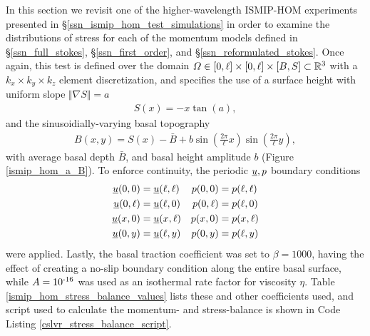 In this section we revisit one of the higher-wavelength ISMIP-HOM experiments presented in \S \ref{ssn_ismip_hom_test_simulations} in order to examine the distributions of stress for each of the momentum models defined in \S \ref{ssn_full_stokes}, \S \ref{ssn_first_order}, and \S \ref{ssn_reformulated_stokes}.  Once again, this test is defined over the domain $\varOmega \in [0,\ell] \times [0,\ell] \times [B,S] \subset \mathbb{R}^3$ with a $k_x \times k_y \times k_z$ element discretization, and specifies the use of a surface height with uniform slope $\Vert \nabla S \Vert = a$
\begin{align*}
  S(x) = - x \tan\left( a \right),
\end{align*}
and the sinusoidially-varying basal topography
\begin{align*}
  B(x,y) = S(x) - \bar{B} + b \sin\left( \frac{2 \pi}{\ell} x \right) \sin\left( \frac{2 \pi}{\ell} y \right),
\end{align*}
with average basal depth $\bar{B}$, and basal height amplitude $b$ (Figure \ref{ismip_hom_a_B}).  To enforce continuity, the periodic $\underline{u},p$ boundary conditions
\begin{align*}
  \underline{u}(0,0)    &= \underline{u}(\ell,\ell) & p(0,0)    &= p(\ell,\ell)\\
  \underline{u}(0,\ell) &= \underline{u}(\ell,0)    & p(0,\ell) &= p(\ell,0)   \\
  \underline{u}(x,0)    &= \underline{u}(x,\ell)    & p(x,0)    &= p(x,\ell)   \\
  \underline{u}(0,y)    &= \underline{u}(\ell,y)    & p(0,y)    &= p(\ell,y)
\end{align*}
were applied.  Lastly, the basal traction coefficient was set to $\beta = 1000$, having the effect of creating a no-slip boundary condition along the entire basal surface, while $A = 10^{\textrm{-16}}$ was used as an isothermal rate factor for viscosity $\eta$.  Table \ref{ismip_hom_stress_balance_values} lists these and other coefficients used, and \CSLVR script used to calculate the momentum- and stress-balance is shown in Code Listing \ref{cslvr_stress_balance_script}.

